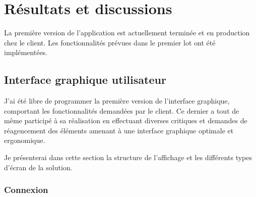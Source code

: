 
\section{Résultats et discussions}

La première version de l'application est actuellement terminée et en production chez le client.
Les fonctionnalités prévues dans le premier lot ont été implémentées.


\subsection{Interface graphique utilisateur}

J'ai été libre de programmer la première version de l'interface graphique, comportant les fonctionnalités demandées par le client.
Ce dernier a tout de même participé à sa réalisation en effectuant diverses critiques et demandes de réagencement des éléments amenant à une interface graphique optimale et ergonomique.

Je présenterai dans cette section la structure de l'affichage et les différents types d'écran de la solution.


\subsubsection{Connexion}

